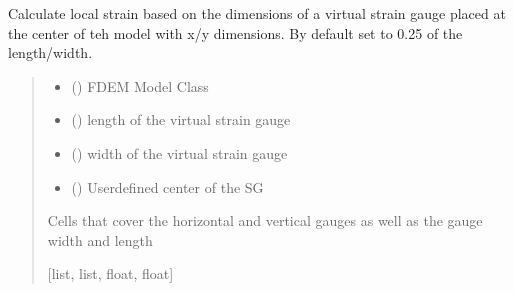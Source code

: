 \documentclass[letterpaper,10pt,english]{sphinxmanual}
\begin{document}
\begin{fulllineitems}
\label{\detokenize{pyfdempp:pyfdempp.complete_BD_thread_pool_generators.set_strain_gauge}}
\pysigstartsignatures
{}
\pysigstopsignatures
\sphinxAtStartPar
Calculate local strain based on the dimensions of a virtual strain gauge placed at the center of teh model with
x/y dimensions. By default set to 0.25 of the length/width.
\begin{quote}\begin{description}
\begin{itemize}
\item {} 
\sphinxAtStartPar
{} () \textendash{} FDEM Model Class

\item {} 
\sphinxAtStartPar
{} () \textendash{} length of the virtual strain gauge

\item {} 
\sphinxAtStartPar
{} () \textendash{} width of the virtual strain gauge

\item {} 
\sphinxAtStartPar
{} (\sphinxstyleliteralemphasis{\sphinxupquote{{[}}}\sphinxstyleliteralemphasis{\sphinxupquote{, }}\sphinxstyleliteralemphasis{\sphinxupquote{, }}\sphinxstyleliteralemphasis{\sphinxupquote{{]}}}) \textendash{} User\sphinxhyphen{}defined center of the SG

\end{itemize}

\sphinxAtStartPar
Cells that cover the horizontal and vertical gauges as well as the gauge width and length

\sphinxAtStartPar
{[}list, list, float, float{]}

\end{description}\end{quote}

\end{fulllineitems}
\end{document}
